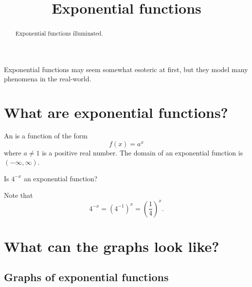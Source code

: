 \documentclass{ximera}
\title[Dig-In:]{Exponential functions}
\begin{document}
\begin{abstract}
  Exponential functions illuminated.
\end{abstract}
\maketitle
 
Exponential functions may seem somewhat esoteric at
first, but they model many phenomena in the real-world.
 
 
 
 
\section{What are exponential functions?}
 

\begin{definition}
  An  is a function of the form
  \[
  f(x) = a^x
  \]
  where  $a\ne 1$ is a positive real number. The domain of an
  exponential function is $(-\infty,\infty)$.
\end{definition}

\begin{question}
  Is $4^{-x}$ an exponential function?
  \begin{prompt}
  \begin{multipleChoice}
  \end{multipleChoice}
  \end{prompt}
  \begin{feedback}
    Note that
    \[
    4^{-x} = \left(4^{-1}\right)^x = \left(\frac{1}{4}\right)^x.
    \]
  \end{feedback}
\end{question}



 
\section{What can the graphs look like?}
 
\subsection{Graphs of exponential functions}
 
\end{document}
